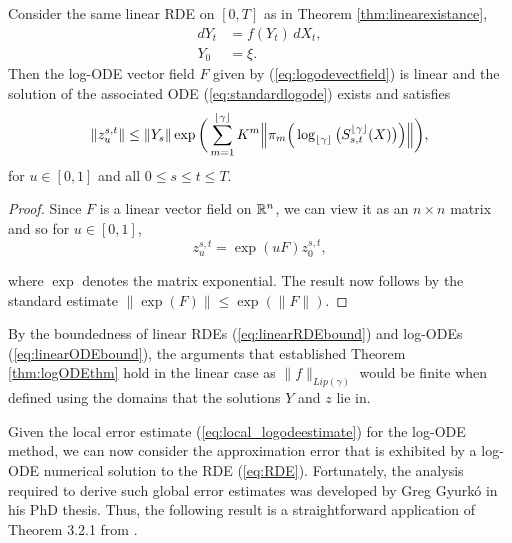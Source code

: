 \begin{theorem}
Consider the same linear RDE on $[0,T]$ as in Theorem \ref{thm:linearexistance},
\begin{align*}
dY_t & = f(Y_t)\,dX_t,\\
Y_0 & = \xi.\nonumber
\end{align*}
Then the log-ODE vector field $F$ given by (\ref{eq:logodevectfield}) is linear and the solution of the associated ODE (\ref{eq:standardlogode}) exists and satisfies
\begin{equation}
\|z_u^{s,t}\| \leq \|Y_s\|\exp\bigg(\sum_{m=1}^{\lfloor \gamma \rfloor}K^m \Big\|\pi_m\Big(\log_{\lfloor \gamma \rfloor}\big(S_{s,t}^{\lfloor \gamma \rfloor}(X)\big)\Big)\Big\|\bigg),
\label{eq:linearODEbound}
\end{equation}
for $u\in[0,1]$ and all $0\leq s\leq t\leq T$.
\end{theorem}
\begin{proof}
Since $F$ is a linear vector field on $\mathbb{R}^n$, we can view it as an $n\times n$ matrix and so for $u\in[0,1]$,
\begin{equation}
z_u^{s,t} = \exp(uF)z_0^{s,t},\nonumber
\end{equation}

where $\exp$ denotes the matrix exponential. The result now follows by the standard estimate $\|\exp(F)\| \leq \exp(\|F\|)$.
\end{proof}
\begin{remark}\label{rmk:linear_rmk}
By the boundedness of linear RDEs (\ref{eq:linearRDEbound}) and log-ODEs (\ref{eq:linearODEbound}), the arguments that established Theorem \ref{thm:logODEthm} hold in the linear case as $\|f\|_{Lip(\gamma)}$ would be finite when defined using the domains that the solutions $Y$ and $z$ lie in.
\end{remark}

Given the local error estimate (\ref{eq:local_logodeestimate}) for the log-ODE method, we can now consider the approximation error that is exhibited by a log-ODE numerical solution to the RDE (\ref{eq:RDE}). Fortunately, the analysis required to derive such global error estimates was developed by Greg Gyurk\'{o} in his PhD thesis. 
Thus, the following result is a straightforward application of Theorem 3.2.1 from \cite{gyurko2008thesis}.\medbreak

